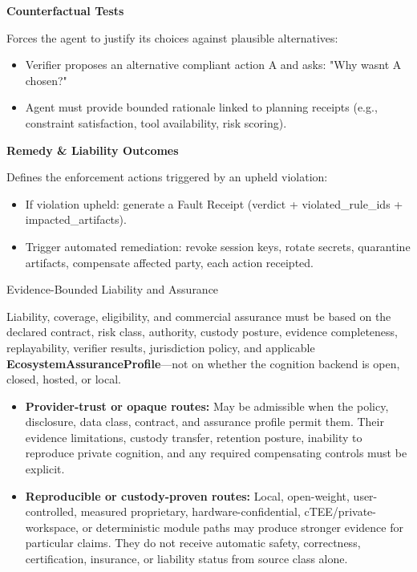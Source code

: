 \documentclass[
  11pt,
]{article}
\providecommand{\tightlist}{%
  \setlength{\itemsep}{0pt}\setlength{\parskip}{0pt}}
\begin{document}
\textbf{Counterfactual Tests}

Forces the agent to justify its choices against plausible alternatives:

\begin{itemize}
\tightlist
\item
  Verifier proposes an alternative compliant action A\textquotesingle{}
  and asks: "Why wasn\textquotesingle t A\textquotesingle{} chosen?"
\item
  Agent must provide bounded rationale linked to planning receipts
  (e.g., constraint satisfaction, tool availability, risk scoring).
\end{itemize}

\textbf{Remedy \& Liability Outcomes}

Defines the enforcement actions triggered by an upheld violation:

\begin{itemize}
\tightlist
\item
  If violation upheld: generate a Fault Receipt (verdict +
  violated\_rule\_ids + impacted\_artifacts).
\item
  Trigger automated remediation: revoke session keys, rotate secrets,
  quarantine artifacts, compensate affected party, each action
  receipted.
\end{itemize}

Evidence-Bounded Liability and Assurance

Liability, coverage, eligibility, and commercial assurance must be based on
the declared contract, risk class, authority, custody posture, evidence
completeness, replayability, verifier results, jurisdiction policy, and
applicable \textbf{EcosystemAssuranceProfile}---not on whether the cognition
backend is open, closed, hosted, or local.

\begin{itemize}
\tightlist
\item
  \textbf{Provider-trust or opaque routes:} May be admissible when the
  policy, disclosure, data class, contract, and assurance profile permit
  them. Their evidence limitations, custody transfer, retention posture,
  inability to reproduce private cognition, and any required compensating
  controls must be explicit.
\item
  \textbf{Reproducible or custody-proven routes:} Local, open-weight,
  user-controlled, measured proprietary, hardware-confidential,
  cTEE/private-workspace, or deterministic module paths may produce
  stronger evidence for particular claims. They do not receive automatic
  safety, correctness, certification, insurance, or liability status from
  source class alone.
\end{itemize}
\end{document}
